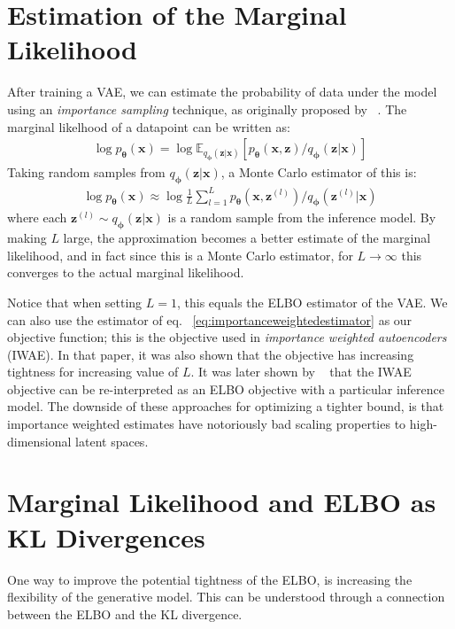 \documentclass[MAL,biber]{nowfnt} %
\newcommand{\bb}[1]{\mathbf{#1}}
\newcommand{\bx}{\bb{x}}
\newcommand{\bz}{\bb{z}}
\newcommand{\bT}{\boldsymbol{\theta}}
\newcommand{\bphi}{\boldsymbol{\phi}}
\newcommand{\pT}{p_{\bT}}
\newcommand{\qP}{q_{\bphi}}
\newcommand{\Exp}[2]{\mathbb{E}_{#1}\left[#2\right]}
\begin{document}
\section{Estimation of the Marginal Likelihood}

After training a VAE, we can estimate the probability of data under the model using an \emph{importance sampling} technique, as originally proposed by ~\cite{rezende2014stochastic}. The marginal likelhood of a datapoint can be written as:
\begin{align}
\log \pT(\bx) = \log \Exp{\qP(\bz|\bx)}{\pT(\bx,\bz)/\qP(\bz|\bx)}
\end{align}
Taking random samples from $\qP(\bz|\bx)$, a Monte Carlo estimator of this is:
\begin{align}
\log \pT(\bx) \approx \log \frac{1}{L} \sum_{l=1}^L \pT(\bx,\bz^{(l)})/\qP(\bz^{(l)}|\bx)
\label{eq:importanceweightedestimator}
\end{align}
where each $\bz^{(l)} \sim \qP(\bz|\bx)$ is a random sample from the inference model. By making $L$ large, the approximation becomes a better estimate of the marginal likelihood, and in fact since this is a Monte Carlo estimator, for $L \to \infty$ this converges to the actual marginal likelihood.

Notice that when setting $L=1$, this equals the ELBO estimator of the VAE. We can also use the estimator of eq. ~\eqref{eq:importanceweightedestimator} as our objective function; this is the objective used in \emph{importance weighted autoencoders}~\citep{burda2015importance} (IWAE). In that paper, it was also shown that the objective has increasing tightness for increasing value of $L$. It was later shown by ~\cite{cremer2017reinterpreting} that the IWAE objective can be re-interpreted as an ELBO objective with a particular inference model. The downside of these approaches for optimizing a tighter bound, is that importance weighted estimates have notoriously bad scaling properties to high-dimensional latent spaces.

\section{Marginal Likelihood and ELBO as KL Divergences}
\label{sec:elbokl}

One way to improve the potential tightness of the ELBO, is increasing the flexibility of the generative model. This can be understood through a connection between the ELBO and the KL divergence.
\end{document}

